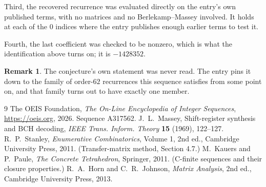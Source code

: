 \documentclass[11pt,a4paper]{article}
\theoremstyle{plain}
\theoremstyle{definition}
\newtheorem{remark}[theorem]{Remark}
\begin{document}
Third, the recovered recurrence was evaluated directly on the entry's own published terms, with
no matrices and no Berlekamp--Massey involved. It holds at each of the $0$ indices where
the entry publishes enough earlier terms to test it.

Fourth, the last coefficient was checked to be nonzero, which is what the identification above
turns on; it is $-1428352$.

\begin{remark}
The conjecture's own statement was never read. The entry pins it down to the family of
order-$62$ recurrences this sequence satisfies from some point on, and that family turns
out to have exactly one member.
\end{remark}

\begin{thebibliography}{9}
 The OEIS Foundation, \emph{The On-Line Encyclopedia of Integer
Sequences}, \url{https://oeis.org}, 2026. Sequence A317562.
 J.~L.~Massey, Shift-register synthesis and BCH decoding, \emph{IEEE
Trans. Inform. Theory} \textbf{15} (1969), 122--127.
 R.~P.~Stanley, \emph{Enumerative Combinatorics}, Volume 1, 2nd ed.,
Cambridge University Press, 2011. (Transfer-matrix method, Section 4.7.)
 M.~Kauers and P.~Paule, \emph{The Concrete Tetrahedron}, Springer, 2011.
(C-finite sequences and their closure properties.)
 R.~A.~Horn and C.~R.~Johnson, \emph{Matrix Analysis}, 2nd ed., Cambridge
University Press, 2013.
\end{thebibliography}
\end{document}
